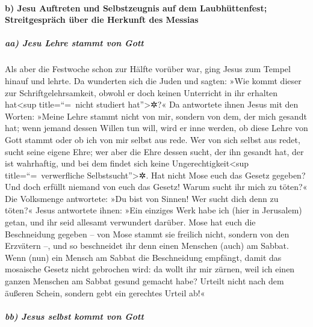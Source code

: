 \hypertarget{b-jesu-auftreten-und-selbstzeugnis-auf-dem-laubhuxfcttenfest-streitgespruxe4ch-uxfcber-die-herkunft-des-messias}{%
\paragraph{b) Jesu Auftreten und Selbstzeugnis auf dem Laubhüttenfest;
Streitgespräch über die Herkunft des
Messias}\label{b-jesu-auftreten-und-selbstzeugnis-auf-dem-laubhuxfcttenfest-streitgespruxe4ch-uxfcber-die-herkunft-des-messias}}

\hypertarget{aa-jesu-lehre-stammt-von-gott}{%
\subparagraph{aa) Jesu Lehre stammt von
Gott}\label{aa-jesu-lehre-stammt-von-gott}}

 Als aber die Festwoche schon zur Hälfte vorüber war,
ging Jesus zum Tempel hinauf und lehrte.  Da wunderten
sich die Juden und sagten: »Wie kommt dieser zur Schriftgelehrsamkeit,
obwohl er doch keinen Unterricht in ihr erhalten hat\textless sup
title=``=~nicht studiert hat''\textgreater✲?«  Da
antwortete ihnen Jesus mit den Worten: »Meine Lehre stammt nicht von
mir, sondern von dem, der mich gesandt hat;  wenn jemand
dessen Willen tun will, wird er inne werden, ob diese Lehre von Gott
stammt oder ob ich von mir selbst aus rede.  Wer von sich
selbst aus redet, sucht seine eigene Ehre; wer aber die Ehre dessen
sucht, der ihn gesandt hat, der ist wahrhaftig, und bei dem findet sich
keine Ungerechtigkeit\textless sup title=``=~verwerfliche
Selbstsucht''\textgreater✲.  Hat nicht Mose euch das
Gesetz gegeben? Und doch erfüllt niemand von euch das Gesetz! Warum
sucht ihr mich zu töten?«  Die Volksmenge antwortete: »Du
bist von Sinnen! Wer sucht dich denn zu töten?«  Jesus
antwortete ihnen: »Ein einziges Werk habe ich (hier in Jerusalem) getan,
und ihr seid allesamt verwundert darüber.  Mose hat euch
die Beschneidung gegeben -- von Mose stammt sie freilich nicht, sondern
von den Erzvätern --, und so beschneidet ihr denn einen Menschen (auch)
am Sabbat.  Wenn (nun) ein Mensch am Sabbat die
Beschneidung empfängt, damit das mosaische Gesetz nicht gebrochen wird:
da wollt ihr mir zürnen, weil ich einen ganzen Menschen am Sabbat gesund
gemacht habe?  Urteilt nicht nach dem äußeren Schein,
sondern gebt ein gerechtes Urteil ab!«

\hypertarget{bb-jesus-selbst-kommt-von-gott}{%
\subparagraph{bb) Jesus selbst kommt von
Gott}\label{bb-jesus-selbst-kommt-von-gott}}

